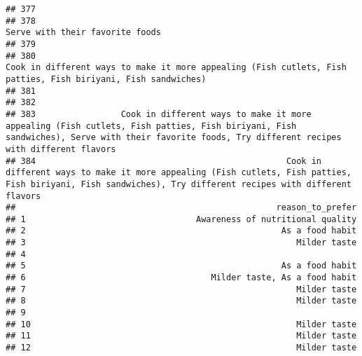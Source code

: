 \documentclass[
]{article}
\begin{document}
\begin{verbatim}
## 377                                                                                                                                                                                                             
## 378                                                                                                                                                                              Serve with their favorite foods
## 379                                                                                                                                                                                                             
## 380                                                                                                Cook in different ways to make it more appealing (Fish cutlets, Fish patties, Fish biriyani, Fish sandwiches)
## 381                                                                                                                                                                                                             
## 382                                                                                                                                                                                                             
## 383                 Cook in different ways to make it more appealing (Fish cutlets, Fish patties, Fish biriyani, Fish sandwiches), Serve with their favorite foods, Try different recipes with different flavors
## 384                                                  Cook in different ways to make it more appealing (Fish cutlets, Fish patties, Fish biriyani, Fish sandwiches), Try different recipes with different flavors
##                                                    reason_to_prefer
## 1                                  Awareness of nutritional quality
## 2                                                   As a food habit
## 3                                                      Milder taste
## 4                                                                  
## 5                                                   As a food habit
## 6                                     Milder taste, As a food habit
## 7                                                      Milder taste
## 8                                                      Milder taste
## 9                                                                  
## 10                                                     Milder taste
## 11                                                     Milder taste
## 12                                                     Milder taste

\end{verbatim}
\end{document}

